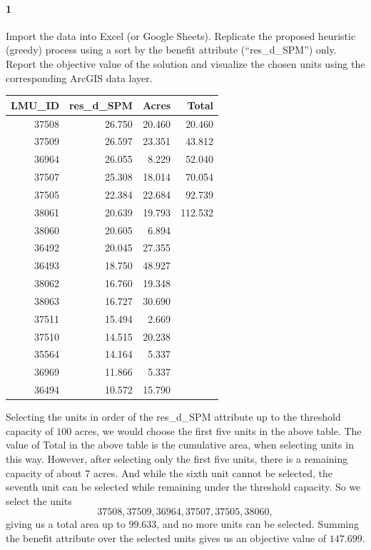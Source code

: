 \documentclass[12pt]{article}
\newenvironment{fullbox}{\begin{lrbox}{\savefullbox}\begin{minipage}{\dimexpr\textwidth-2\fboxsep\relax}}{\end{minipage}\end{lrbox}\begin{center}\framebox[\textwidth]{\usebox{\savefullbox}}\end{center}}
\newenvironment{pbox}[1][]{\begin{fullbox}\ifx#1\empty\else\paragraph{#1}\fi}{\end{fullbox}}
\theoremstyle{definition}
\begin{document}
\thispagestyle{title}


\begin{pbox}[1]
     Import the data into Excel (or Google Sheets). Replicate the proposed heuristic (greedy) process using a sort by the benefit attribute (``res\_d\_SPM'') only. Report the objective value of the solution and visualize the chosen units using the corresponding ArcGIS data layer.
\end{pbox}

\begin{center}
    \begin{tabular}{r|r|r|r}
        LMU\_ID & res\_d\_SPM & Acres       & Total       \\
        \hline
        37508  & 26.750    & 20.460 & 20.460  \\
        37509  & 26.597    & 23.351 & 43.812  \\
        36964  & 26.055    & 8.229  & 52.040  \\
        37507  & 25.308    & 18.014 & 70.054  \\
        37505  & 22.384    & 22.684 & 92.739  \\
        38061  & 20.639    & 19.793 & 112.532 \\
        38060  & 20.605    & 6.894  &         \\
        36492  & 20.045    & 27.355 &         \\
        36493  & 18.750    & 48.927 &         \\
        38062  & 16.760    & 19.348 &         \\
        38063  & 16.727    & 30.690 &         \\
        37511  & 15.494    & 2.669  &         \\
        37510  & 14.515    & 20.238 &         \\
        35564  & 14.164    & 5.337  &         \\
        36969  & 11.866    & 5.337  &         \\
        36494  & 10.572    & 15.790 &           
    \end{tabular}
\end{center}

Selecting the units in order of the res\_d\_SPM attribute up to the threshold capacity of $100$ acres, we would choose the first five units in the above table. The value of Total in the above table is the cumulative area, when selecting units in this way. However, after selecting only the first five units, there is a remaining capacity of about $7$ acres. And while the sixth unit cannot be selected, the seventh unit can be selected while remaining under the threshold capacity. So we select the units
\[
    37508, 37509, 36964, 37507, 37505, 38060,
\]
giving us a total area up to $99.633$, and no more units can be selected. Summing the benefit attribute over the selected units gives us an objective value of $147.699$.
\end{document}
